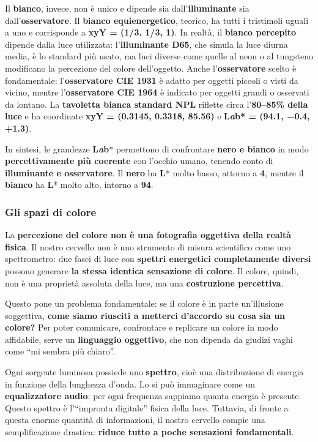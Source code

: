 \documentclass[
]{article}
\begin{document}
Il \textbf{bianco}, invece, non è unico e dipende sia dall'\textbf{illuminante} sia dall'\textbf{osservatore}. Il \textbf{bianco equienergetico}, teorico, ha tutti i tristimoli uguali a uno e corrisponde a \textbf{xyY = (1/3, 1/3, 1)}. In realtà, il \textbf{bianco percepito} dipende dalla luce utilizzata: l'\textbf{illuminante D65}, che simula la luce diurna media, è lo standard più usato, ma luci diverse come quelle al neon o al tungsteno modificano la percezione del colore dell'oggetto. Anche l'\textbf{osservatore} scelto è fondamentale: l'\textbf{osservatore CIE 1931} è adatto per oggetti piccoli o visti da vicino, mentre l'\textbf{osservatore CIE 1964} è indicato per oggetti grandi o osservati da lontano. La \textbf{tavoletta bianca standard NPL} riflette circa l'\textbf{80--85\% della luce} e ha coordinate \textbf{xyY = (0.3145, 0.3318, 85.56)} e \textbf{L\emph{a}b* = (94.1, −0.4, +1.3)}.

In sintesi, le grandezze \textbf{L\emph{a}b}* permettono di confrontare \textbf{nero e bianco} in modo \textbf{percettivamente più coerente} con l'occhio umano, tenendo conto di \textbf{illuminante e osservatore}. Il \textbf{nero} ha \textbf{L}* molto basso, attorno a \textbf{4}, mentre il \textbf{bianco} ha \textbf{L}* molto alto, intorno a \textbf{94}.

\hypertarget{gli-spazi-di-colore}{%
\subsubsection{Gli spazi di colore}\label{gli-spazi-di-colore}}

La \textbf{percezione del colore non è una fotografia oggettiva della realtà fisica}. Il nostro cervello non è uno strumento di misura scientifico come uno spettrometro: due fasci di luce con \textbf{spettri energetici completamente diversi} possono generare \textbf{la stessa identica sensazione di colore}. Il colore, quindi, non è una proprietà assoluta della luce, ma una \textbf{costruzione percettiva}.

Questo pone un problema fondamentale: se il colore è in parte un'illusione soggettiva, \textbf{come siamo riusciti a metterci d'accordo su cosa sia un colore?} Per poter comunicare, confrontare e replicare un colore in modo affidabile, serve un \textbf{linguaggio oggettivo}, che non dipenda da giudizi vaghi come ``mi sembra più chiaro''.

Ogni sorgente luminosa possiede uno \textbf{spettro}, cioè una distribuzione di energia in funzione della lunghezza d'onda. Lo si può immaginare come un \textbf{equalizzatore audio}: per ogni frequenza sappiamo quanta energia è presente. Questo spettro è l'``impronta digitale'' fisica della luce. Tuttavia, di fronte a questa enorme quantità di informazioni, il nostro cervello compie una semplificazione drastica: \textbf{riduce tutto a poche sensazioni fondamentali}.
\end{document}
